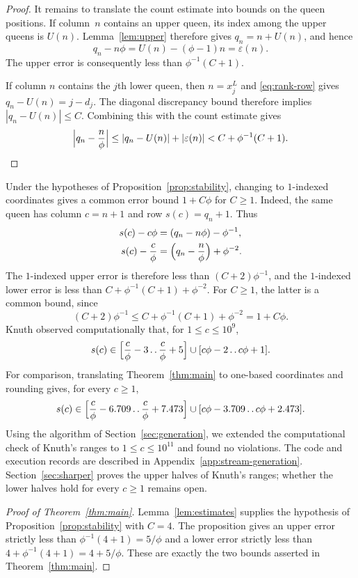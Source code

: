 \begin{proof}
It remains to translate the count estimate into bounds on the queen
positions. If column~$n$ contains an upper queen, its index among the
upper queens is $U(n)$. Lemma~\ref{lem:upper} therefore gives
$q_n=n+U(n)$, and hence
\[
 q_n-n\phi=U(n)-(\phi-1)n=\varepsilon(n).
\]
The upper error is consequently less than $\phi^{-1}(C+1)$.

If column $n$ contains the $j$th lower queen, then $n=x_j^L$ and
\eqref{eq:rank-row} gives $q_n-U(n)=j-d_j$. The diagonal discrepancy bound therefore
implies $|q_n-U(n)|\le C$. Combining this with the count estimate gives
\[
 \Bigl|q_n-\frac{n}{\phi}\Bigr|
 \le |q_n-U(n)|+|\varepsilon(n)|
 <C+\phi^{-1}(C+1).\qedhere
\]
\end{proof}

\begin{remark}
Under the hypotheses of Proposition~\ref{prop:stability}, changing to
$1$-indexed coordinates gives a common error bound $1+C\phi$ for $C\ge1$.
Indeed, the same queen has column $c=n+1$
and row $s(c)=q_n+1$. Thus
\[
 \begin{aligned}
 s(c)-c\phi&=(q_n-n\phi)-\phi^{-1},\\
 s(c)-\frac{c}{\phi}&=\Bigl(q_n-\frac{n}{\phi}\Bigr)+\phi^{-2}.
 \end{aligned}
\]
The $1$-indexed upper error is therefore less than $(C+2)\phi^{-1}$,
and the $1$-indexed lower error is less than
$C+\phi^{-1}(C+1)+\phi^{-2}$. For $C\ge1$, the latter is a common bound,
since
\[
 (C+2)\phi^{-1}\le
 C+\phi^{-1}(C+1)+\phi^{-2}=1+C\phi.
\]
Knuth \cite[answer 7.2.2.1--38]{Knuth4B} observed
computationally that, for $1\le c\le10^9$,
\[
 s(c)\in
 \Bigl[\frac{c}{\phi}-3\mathinner{\ldotp\ldotp}\frac{c}{\phi}+5\Bigr]
 \cup[c\phi-2\mathinner{\ldotp\ldotp} c\phi+1].
\]
For comparison, translating Theorem~\ref{thm:main} to one-based
coordinates and rounding gives, for every $c\ge1$,
\[
 s(c)\in
 \Bigl[\frac{c}{\phi}-6.709\mathinner{\ldotp\ldotp}\frac{c}{\phi}+7.473\Bigr]
 \cup[c\phi-3.709\mathinner{\ldotp\ldotp} c\phi+2.473].
\]
Using the algorithm of Section~\ref{sec:generation}, we extended the
computational check of Knuth's ranges to $1\le c\le10^{11}$ and found
no violations. The code and execution records are described in
Appendix~\ref{app:stream-generation}.
Section~\ref{sec:sharper} proves the upper halves of
Knuth's ranges; whether the lower halves hold for every $c\ge1$
remains open.
\end{remark}

\begin{proof}[Proof of Theorem~\ref{thm:main}]
Lemma~\ref{lem:estimates} supplies the hypothesis of
Proposition~\ref{prop:stability} with $C=4$. The proposition gives an
upper error strictly less than $\phi^{-1}(4+1)=5/\phi$ and a lower error
strictly less than $4+\phi^{-1}(4+1)=4+5/\phi$. These are exactly the two
bounds asserted in Theorem~\ref{thm:main}.
\end{proof}

